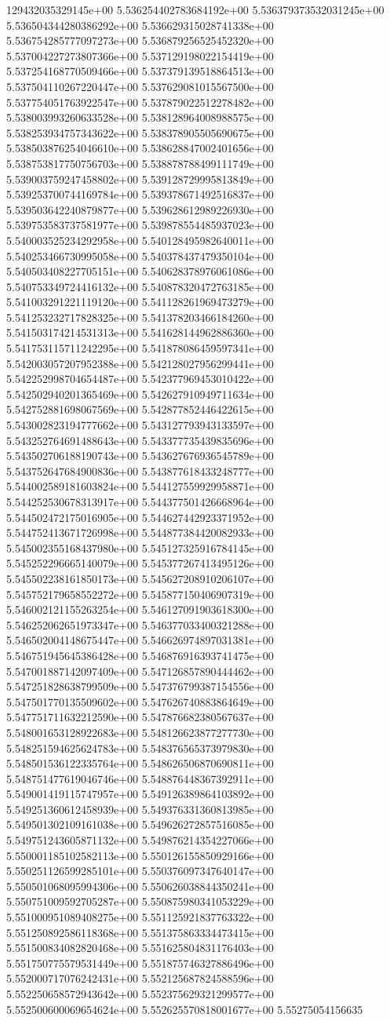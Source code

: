 129432035329145e+00	5.536254402783684192e+00	5.536379373532031245e+00	5.536504344280386292e+00	5.536629315028741338e+00	5.536754285777097273e+00	5.536879256525452320e+00	5.537004227273807366e+00	5.537129198022154419e+00	5.537254168770509466e+00	5.537379139518864513e+00	5.537504110267220447e+00	5.537629081015567500e+00	5.537754051763922547e+00	5.537879022512278482e+00	5.538003993260633528e+00	5.538128964008988575e+00	5.538253934757343622e+00	5.538378905505690675e+00	5.538503876254046610e+00	5.538628847002401656e+00	5.538753817750756703e+00	5.538878788499111749e+00	5.539003759247458802e+00	5.539128729995813849e+00	5.539253700744169784e+00	5.539378671492516837e+00	5.539503642240879877e+00	5.539628612989226930e+00	5.539753583737581977e+00	5.539878554485937023e+00	5.540003525234292958e+00	5.540128495982640011e+00	5.540253466730995058e+00	5.540378437479350104e+00	5.540503408227705151e+00	5.540628378976061086e+00	5.540753349724416132e+00	5.540878320472763185e+00	5.541003291221119120e+00	5.541128261969473279e+00	5.541253232717828325e+00	5.541378203466184260e+00	5.541503174214531313e+00	5.541628144962886360e+00	5.541753115711242295e+00	5.541878086459597341e+00	5.542003057207952388e+00	5.542128027956299441e+00	5.542252998704654487e+00	5.542377969453010422e+00	5.542502940201365469e+00	5.542627910949711634e+00	5.542752881698067569e+00	5.542877852446422615e+00	5.543002823194777662e+00	5.543127793943133597e+00	5.543252764691488643e+00	5.543377735439835696e+00	5.543502706188190743e+00	5.543627676936545789e+00	5.543752647684900836e+00	5.543877618433248777e+00	5.544002589181603824e+00	5.544127559929958871e+00	5.544252530678313917e+00	5.544377501426668964e+00	5.544502472175016905e+00	5.544627442923371952e+00	5.544752413671726998e+00	5.544877384420082933e+00	5.545002355168437980e+00	5.545127325916784145e+00	5.545252296665140079e+00	5.545377267413495126e+00	5.545502238161850173e+00	5.545627208910206107e+00	5.545752179658552272e+00	5.545877150406907319e+00	5.546002121155263254e+00	5.546127091903618300e+00	5.546252062651973347e+00	5.546377033400321288e+00	5.546502004148675447e+00	5.546626974897031381e+00	5.546751945645386428e+00	5.546876916393741475e+00	5.547001887142097409e+00	5.547126857890444462e+00	5.547251828638799509e+00	5.547376799387154556e+00	5.547501770135509602e+00	5.547626740883864649e+00	5.547751711632212590e+00	5.547876682380567637e+00	5.548001653128922683e+00	5.548126623877277730e+00	5.548251594625624783e+00	5.548376565373979830e+00	5.548501536122335764e+00	5.548626506870690811e+00	5.548751477619046746e+00	5.548876448367392911e+00	5.549001419115747957e+00	5.549126389864103892e+00	5.549251360612458939e+00	5.549376331360813985e+00	5.549501302109161038e+00	5.549626272857516085e+00	5.549751243605871132e+00	5.549876214354227066e+00	5.550001185102582113e+00	5.550126155850929166e+00	5.550251126599285101e+00	5.550376097347640147e+00	5.550501068095994306e+00	5.550626038844350241e+00	5.550751009592705287e+00	5.550875980341053229e+00	5.551000951089408275e+00	5.551125921837763322e+00	5.551250892586118368e+00	5.551375863334473415e+00	5.551500834082820468e+00	5.551625804831176403e+00	5.551750775579531449e+00	5.551875746327886496e+00	5.552000717076242431e+00	5.552125687824588596e+00	5.552250658572943642e+00	5.552375629321299577e+00	5.552500600069654624e+00	5.552625570818001677e+00	5.55275054156635